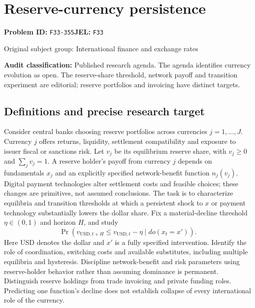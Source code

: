 \documentclass[11pt,a4paper]{article}
\begin{document}
\section*{Reserve-currency persistence}
\textbf{Problem ID:} \texttt{F33-355}\quad \textbf{JEL:} \texttt{F33}\par
\label{problem:OP-0334}
{\sffamily\small\color{muted}Original subject group: International finance and exchange rates\par}
\label{definitions:problem:30007616}
\textbf{Audit classification:} Published research agenda. The agenda identifies currency evolution as open. The reserve-share threshold, network payoff and transition experiment are editorial; reserve portfolios and invoicing have distinct targets.
\subsection*{Definitions and precise research target}
Consider central banks choosing reserve portfolios across currencies \(j=1,\ldots,J\). Currency \(j\) offers returns, liquidity, settlement compatibility and exposure to issuer fiscal or sanctions risk. Let \(v_j\) be its equilibrium reserve share, with \(v_j\geq0\) and \(\sum_jv_j=1\). A reserve holder's payoff from currency \(j\) depends on fundamentals \(x_j\) and an explicitly specified network-benefit function \(n_j(v_j)\). Digital payment technologies alter settlement costs and feasible choices; these changes are primitives, not assumed conclusions. The task is to characterize equilibria and transition thresholds at which a persistent shock to \(x\) or payment technology substantially lowers the dollar share. Fix a material-decline threshold \(\eta\in(0,1)\) and horizon \(H\), and study
\[\Pr(v_{\mathrm{USD},t+H}\leq v_{\mathrm{USD},t}-\eta\mid do(x_t=x')).\]
Here USD denotes the dollar and \(x'\) is a fully specified intervention. Identify the role of coordination, switching costs and available substitutes, including multiple equilibria and hysteresis. Discipline network-benefit and risk parameters using reserve-holder behavior rather than assuming dominance is permanent. Distinguish reserve holdings from trade invoicing and private funding roles. Predicting one function's decline does not establish collapse of every international role of the currency.
\end{document}
